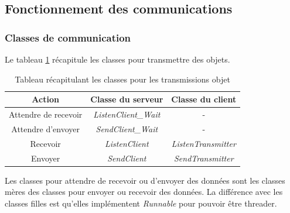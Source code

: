 \documentclass[a4paper, titlepage]{livret}
\begin{document}
\subsection{Fonctionnement des communications}

\subsubsection{Classes de communication}
Le tableau \ref{tab1comClasses} récapitule les classes pour transmettre des objets.

  \begin{table}
    \begin{center}
      \begin{tabular}{|c|c|c|}
         \hline \textbf{Action}&\textbf{Classe du serveur}&\textbf{Classe du client} \\
         \hline Attendre de recevoir&\textit{ListenClient\_Wait}&- \\
         \hline Attendre d’envoyer&\textit{SendClient\_Wait}&- \\
         \hline Recevoir&\textit{ListenClient}&\textit{ListenTransmitter} \\
         \hline Envoyer&\textit{SendClient}&\textit{SendTransmitter}\\
         \hline
      \end{tabular}
      \caption{Tableau récapitulant les classes pour les transmissions objet}  
      \label{tab1comClasses}
    \end{center}
  \end{table}
  
  Les classes pour attendre de recevoir ou d’envoyer des données sont les classes mères des classes pour envoyer ou recevoir des données. La différence avec les classes filles est qu’elles implémentent \textit{Runnable} pour pouvoir être threader.
\end{document}

